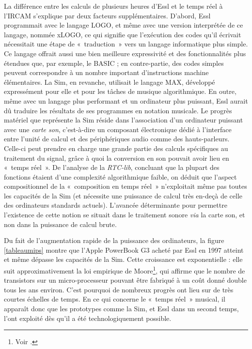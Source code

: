 \documentclass[a4paper,12pt]{article}
\newcommand{\guill}[1]{«~#1~»}
\begin{document}
La différence entre les calculs de plusieurs heures d'Essl et le temps réel à l'IRCAM s'explique par deux facteurs supplémentaires. D'abord, Essl programmait avec le langage LOGO, et même avec une version interprétée de ce langage, nommée xLOGO, ce qui signifie que l'exécution des codes qu'il écrivait nécessitait une étape de \guill{traduction} vers un langage informatique plus simple. Ce langage offrait aussi une bien meilleure expressivité et des fonctionnalités plus étendues que, par exemple, le BASIC ; en contre-partie, des codes simples peuvent correspondre à un nombre important d'instructions machine élémentaires. La Sim, en revanche, utilisait le langage MAX, développé expressément pour elle et pour les tâches de musique algorithmique. En outre, même avec un langage plus performant et un ordinateur plus puissant, Essl aurait dû traduire les résultats de ses programmes en notation musicale. Le progrès matériel que représente la Sim réside dans l'association d'un ordinateur puissant avec une \emph{carte son}, c'est-à-dire un composant électronique dédié à l'interface entre l'unité de calcul et des périphériques audio comme des hauts-parleurs. Celle-ci peut prendre en charge une grande partie des calculs spécifiques au traitement du signal, grâce à quoi la conversion en son pouvait avoir lieu en \guill{temps réel}. De l'analyse de la \emph{RTC-lib}, concluant que la plupart des fonctions étaient d'une complexité algorithmique faible, on déduit que l'aspect compositionnel de la \guill{composition en temps réel} n'exploitait même pas toutes les capacités de la Sim (et nécessite une puissance de calcul très en-deçà de celle des ordinateurs standards actuels). L'avancée déterminante pour permettre l'existence de cette notion se situait dans le traitement sonore \emph{via} la carte son, et non dans la puissance de calcul brute.

Du fait de l'augmentation rapide de la puissance des ordinateurs, la figure \ref{tableaumips} montre que l'Apple PowerBook G3 acheté par Essl en 1997 atteint et même dépasse les capacités de la Sim. Cette croissance est exponentielle : elle suit approximativement la loi empirique de Moore\footnote{Voir \cite{present2000cramming}.}, qui affirme que le nombre de transistors sur un micro-processeur pouvant être fabriqué à un coût donné double tous les ans environ. C'est pourquoi de nombreux progrès ont lieu sur de très courtes échelles de temps. En ce qui concerne le \guill{temps réel} musical, il apparaît donc que les prototypes comme la Sim, et Essl dans un second temps, l'ont exploité dès qu'il a été technologiquement possible.
\end{document}
